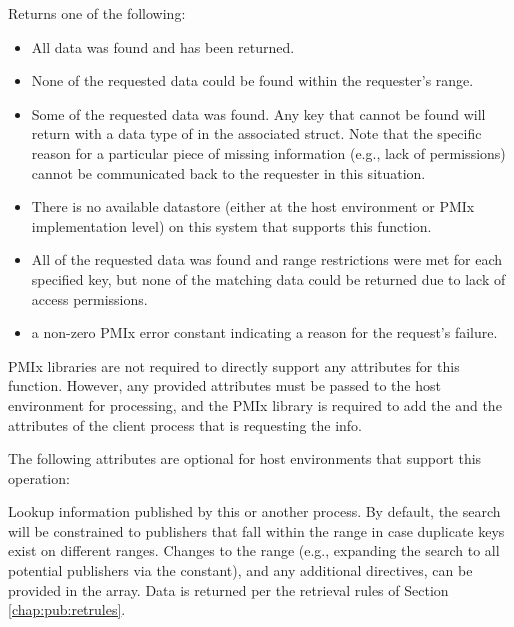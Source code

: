 Returns one of the following:

\begin{itemize}
\item {} All data was found and has been returned.

\item {} None of the requested data could be found within the requester's range.

\item {} Some of the requested data was found.
Any key that cannot be found will return with a data type of  in the associated  struct. Note that the specific reason for a particular piece of missing information (e.g., lack of permissions) cannot be communicated back to the requester in this situation.

\item {} There is no available datastore (either at the host environment or \ac{PMIx} implementation level) on this system that supports this function.

\item {} All of the requested data was found and range restrictions were met for each specified key, but none of the matching data could be returned due to lack of access permissions.

\item a non-zero \ac{PMIx} error constant indicating a reason for the request's failure.
\end{itemize}

\reqattrstart
\ac{PMIx} libraries are not required to directly support any attributes for this function. However, any provided attributes must be passed to the host environment for processing, and the \ac{PMIx} library is required to add the  and the  attributes of the client process that is requesting the info.

\reqattrend

\optattrstart
The following attributes are optional for host environments that support this operation:


\optattrend

\descr

Lookup information published by this or another process.
By default, the search will be constrained to publishers that fall within the  range in case duplicate keys exist on different ranges.
Changes to the range (e.g., expanding the search to all potential publishers via the  constant), and any additional directives, can be provided in the  array. Data is returned per the retrieval rules of Section \ref{chap:pub:retrules}.

